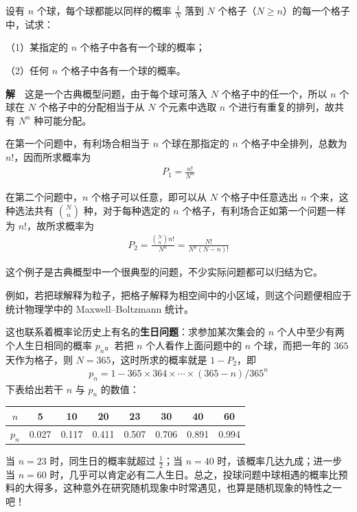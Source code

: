 \documentclass[../../main.tex]{subfiles}
\begin{document}
\begin{example}[投球入格]\label{example:ch01-投球入格}
设有 $n$ 个球，每个球都能以同样的概率 $\frac{1}{N}$ 落到 $N$ 个格子（$N\geqslant n$）的每一个格子中，试求：

（1）某指定的 $n$ 个格子中各有一个球的概率；

（2）任何 $n$ 个格子中各有一个球的概率。

\textbf{解}~~这是一个古典概型问题，由于每个球可落入 $N$ 个格子中的任一个，所以 $n$ 个球在 $N$ 个格子中的分配相当于从 $N$ 个元素中选取 $n$ 个进行有重复的排列，故共有 $N^n$ 种可能分配。

在第一个问题中，有利场合相当于 $n$ 个球在那指定的 $n$ 个格子中全排列，总数为 $n!$，因而所求概率为
\begin{align*}
P_1=\frac{n!}{N^n}
\end{align*}

在第二个问题中，$n$ 个格子可以任意，即可以从 $N$ 个格子中任意选出 $n$ 个来，这种选法共有 $\binom{N}{n}$ 种，对于每种选定的 $n$ 个格子，有利场合正如第一个问题一样为 $n!$，故所求概率为
\begin{align*}
P_2=\frac{\binom{N}{n}n!}{N^n}=\frac{N!}{N^n(N-n)!}
\end{align*}

这个例子是古典概型中一个很典型的问题，不少实际问题都可以归结为它。

例如，若把球解释为粒子，把格子解释为相空间中的小区域，则这个问题便相应于统计物理学中的 Maxwell--Boltzmann 统计。

这也联系着概率论历史上有名的\textbf{生日问题}：求参加某次集会的 $n$ 个人中至少有两个人生日相同的概率 $p_n$。若把 $n$ 个人看作上面问题中的 $n$ 个球，而把一年的 $365$ 天作为格子，则 $N=365$，这时所求的概率就是 $1-P_2$，即
\begin{align*}
p_n=1-365\times 364\times\cdots\times(365-n)/365^n
\end{align*}
下表给出若干 $n$ 与 $p_n$ 的数值：
\begin{center}
\begin{tabular}{c|ccccccc}
$n$ & 5 & 10 & 20 & 23 & 30 & 40 & 60 \\
\hline
$p_n$ & 0.027 & 0.117 & 0.411 & 0.507 & 0.706 & 0.891 & 0.994
\end{tabular}
\end{center}
当 $n=23$ 时，同生日的概率就超过 $\frac{1}{2}$；当 $n=40$ 时，该概率几达九成；进一步当 $n=60$ 时，几乎可以肯定必有二人生日。总之，投球问题中球相遇的概率比预料的大得多，这种意外在研究随机现象中时常遇见，也算是随机现象的特性之一吧！
\end{example}
\end{document}
